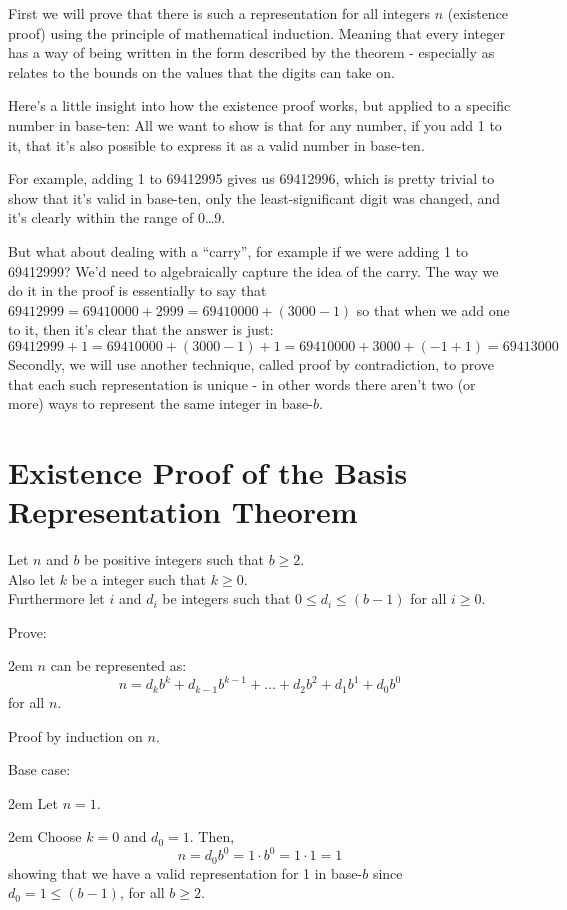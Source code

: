 \documentclass{article}
\newenvironment{jprIn}{\begin{adjustwidth}{2em}{}}{\end{adjustwidth}}
\begin{document}
First we will prove that there is such a representation for all
integers $n$ (existence proof) using the principle of mathematical induction.
Meaning that every integer has a way of being written
in the form described by the theorem - especially as
relates to the bounds on the values that the digits can take on.

Here's a little insight into how the existence proof works, but applied to a specific number in base-ten:
All we want to show is that for any number, if you add 1 to it, that it's also possible to express it as a valid number in base-ten.

For example, adding 1 to 69412995 gives us 69412996, which is pretty trivial to show that it's valid in base-ten, only the least-significant digit was
changed, and it's clearly within the range of 0\dots{}9.

But what about dealing with a ``carry'', for example 
if we were adding 1 to 69412999? We'd need to algebraically capture the idea of the carry.  The way
we do it in the proof is essentially to say that $69412999 = 69410000 + 2999 = 69410000 + (3000-1)$ so that when we add one to it, then
it's clear that the answer is just:
\[69412999 + 1 = 69410000 + (3000-1) + 1 = 69410000 + 3000 + (-1 + 1) = 69413000\]
Secondly, we will use another technique, called proof by contradiction,
to prove that each such representation is unique - in other
words there aren't two (or more) ways to represent the same integer in base-$b$.

\section*{Existence Proof of the Basis Representation Theorem}
Let $n$ and $b$ be positive integers such that $b\ge2$.\\
Also let $k$ be a integer such that $k\ge0$.\\
Furthermore let $i$ and $d_i$ be integers such that $0\le{}d_i\le{}(b-1)$ for all $i\ge0$.

Prove:
\begin{jprIn}
$n$ can be represented as:
\[n=d_kb^k+d_{k-1}b^{k-1}+\dots+d_2b^2+d_1b^1+d_0b^0\]
for all $n$.
\end{jprIn}
Proof by induction on $n$.

Base case:
\begin{jprIn}
Let $n=1$.

\begin{jprIn}
Choose $k=0$ and $d_0=1$.  Then,
\[n=d_0b^0=1\cdot{}b^0=1\cdot{}1=1\]
showing that we have a valid representation for 1 in base-$b$ since\\
$d_0=1\le(b-1)$, for all $b\ge2$.
\end{jprIn}
\end{jprIn}
\bigskip
\end{document}
